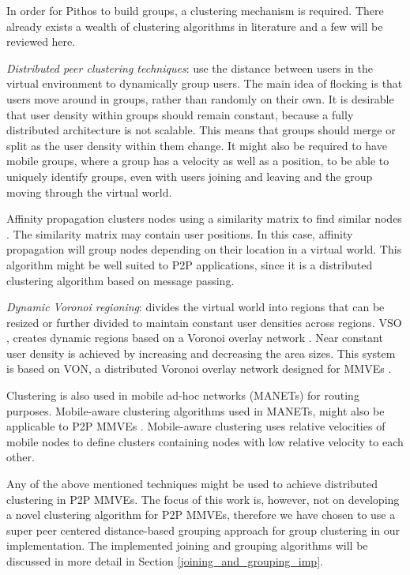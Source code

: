 In order for Pithos to build groups, a clustering mechanism is required. There already exists a wealth of clustering algorithms in literature and a few will be reviewed here.

\emph{Distributed peer clustering techniques}: use the distance between users in the virtual environment to dynamically group users. The main idea of flocking is that users move around in groups, rather than randomly on their own. It is desirable that user density within groups should remain constant, because a fully distributed architecture is not scalable. This means that groups should merge or split as the user density within them change. It might also be required to have mobile groups, where a group has a velocity as well as a position, to be able to uniquely identify groups, even with users joining and leaving and the group moving through the virtual world.

Affinity propagation clusters nodes using a similarity matrix to find similar nodes \cite{affinity_propagation}. The similarity matrix may contain user positions. In this case, affinity propagation will group nodes depending on their location in a virtual world. This algorithm might be well suited to P2P applications, since it is a distributed clustering algorithm based on message passing.

\emph{Dynamic Voronoi regioning}: divides the virtual world into regions that can be resized or further divided to maintain constant user densities across regions. VSO \cite{VSO_Hu_Chen}, \cite{self_organising_sps_post} creates dynamic regions based on a Voronoi overlay network \cite{voronoi_diagrams_survey}. Near constant user density is achieved by increasing and decreasing the area sizes. This system is based on VON, a distributed Voronoi overlay network designed for MMVEs \cite{VON_VAST}.

Clustering is also used in mobile ad-hoc networks (MANETs) for routing purposes. Mobile-aware clustering algorithms used in MANETs, might also be applicable to P2P MMVEs \cite{clustering_survey}. Mobile-aware clustering uses relative velocities of mobile nodes to define clusters containing nodes with low relative velocity to each other.

Any of the above mentioned techniques might be used to achieve distributed clustering in P2P MMVEs. The focus of this work is, however, not on developing a novel clustering algorithm for P2P MMVEs, therefore we have chosen to use a super peer centered distance-based grouping approach for group clustering in our implementation. The implemented joining and grouping algorithms will be discussed in more detail in Section \ref{joining_and_grouping_imp}.

